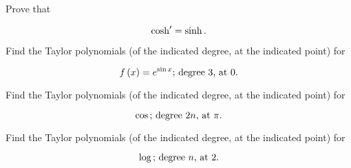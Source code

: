 \documentclass[12pt,letterpaper]{hmcpset}
\newcommand{\fx}{f \left( x \right) =}
\begin{document}
\begin{problem}[18.8.f]

    Prove that

    \[
        \cosh^\prime = \sinh.\\
    \]

\end{problem}

\begin{solution}

\end{solution}

\begin{problem}[20.1.ii]

    Find the Taylor polynomials (of the indicated degree, at the indicated point) for

    \[
        \fx e^{\sin x}\text{; degree } 3\text{, at }0.\\
    \]

\end{problem}

\begin{solution}

\end{solution}

\begin{problem}[20.1.iv]

    Find the Taylor polynomials (of the indicated degree, at the indicated point) for

    \[
        \cos\text{; degree } 2n\text{, at }\pi.\\
    \]

\end{problem}

\begin{solution}

\end{solution}

\begin{problem}[20.1.vi]

    Find the Taylor polynomials (of the indicated degree, at the indicated point) for

    \[
        \log\text{; degree } n\text{, at }2.\\
    \]

\end{problem}

\begin{solution}

\end{solution}
\end{document}
